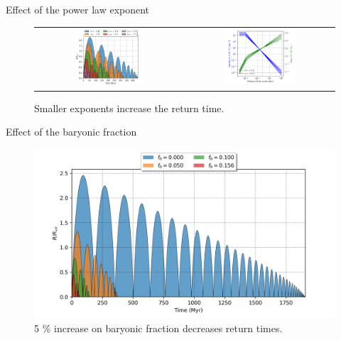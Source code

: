 \documentclass{beamer}
\begin{document}
\begin{frame}{Effect of the power law exponent}
	\begin{figure}[h]
		\centering
		\begin{tabular}{cc}
			\includegraphics[width = 0.5\textwidth]{"../Files/Week 6/power_law"} & \includegraphics[width = 0.5\textwidth]{"../Files/Week 6/power_law_density"}
		\end{tabular}
		\caption{Smaller exponents increase the return time.}
	\end{figure}
\end{frame}

\begin{frame}{Effect of the baryonic fraction}
	\begin{figure}[h]
		\centering
		\includegraphics[height=0.7\textheight]{"../Files/Week 5/baryonic_fraction_comparison"}
		\caption{5 \% increase on baryonic fraction decreases return times.}
	\end{figure}
\end{frame}
\end{document}

